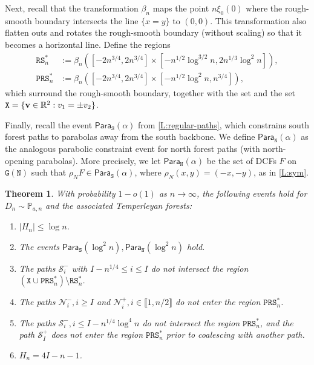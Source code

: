 \documentclass[11pt,twoside]{amsart}
\theoremstyle{plain}
\newtheorem{thm}{Theorem}[section]
\numberwithin{quest}{section}
\theoremstyle{remark}
\numberwithin{rem}{section}
\theoremstyle{definition}
\newcommand{\R}{\mathbb{R}}
\renewcommand{\P}{\mathbb{P}}
\newcommand{\cS}{\mathcal{S}}
\newcommand{\cN}{\mathcal{N}}
\newcommand{\II}[1]{\llbracket #1 \rrbracket}
\renewcommand{\tt}[1]{{\mathtt{#1}}}
\begin{document}
	Next, recall that the transformation $\beta_n$ maps the point $n \xi_0(0)$ where the rough-smooth boundary intersects the line $\{x = y\}$ to $(0,0)$. This transformation also flatten outs and rotates the rough-smooth boundary (without scaling) so that it becomes a horizontal line. Define the regions
	\begin{align*}
		\tt{RS}_n^* &:= \beta_n([-2n^{3/4}, 2n^{3/4}] \times [- n^{1/2} \log^{3/2} n, 2n^{1/3} \log^2 n]), \\
		\tt{PRS}_n^* &:= \beta_n([-2n^{3/4}, 2n^{3/4}] \times [- n^{1/2} \log^{2} n, n^{3/4}]),
	\end{align*}
	which surround the rough-smooth boundary, together with the set
	and the set $\tt{X} = \{{\bf v} \in \R^2 : v_1 = \pm v_2\}$.
	
	Finally, recall the event $\mathsf{Para}_\tt{S}(\alpha)$ from \cref{L:regular-paths}, which constrains south forest paths to parabolas away from the south backbone. We define $\mathsf{Para}_\tt{N}(\alpha)$ as the analogous parabolic constraint event for north forest paths (with north-opening parabolas). More precisely, we let $\mathsf{Para}_\tt{N}(\alpha)$ be the set of DCFs $F$ on $\tt{G(N)}$ such that $\rho_N F \in \mathsf{Para}_\tt{S}(\alpha)$, where $\rho_N(x, y) = (-x, -y)$, as in \cref{L:sym}.
	\begin{thm}
		\label{T:main-3-restatement}
		With probability $1 - o(1)$ as $n \to \infty$, the following events hold for $D_n \sim \P_{a, n}$ and the associated Temperleyan forests:
		\begin{enumerate}[label=\arabic*.]
			\item $|H_n| \le \log n$.
			\item The events $\mathsf{Para}_\tt{S}(\log^2 n), \mathsf{Para}_\tt{N}(\log^2 n)$ hold.
			\item The paths $\cS_i^-$ with $I - n^{1/4} \le i \le I$ do not intersect the region $(\tt{X} \cup \tt{PRS}^*_n)\setminus \tt{RS}^*_n$.
			\item The paths $\cN_i^-, i \ge I$ and $\cN_i^+, i \in \II{1, n/2}$ do not enter the region $\tt{PRS}^*_n$.
			\item The paths $\cS_i^-, i \le I - n^{1/4} \log^4 n$ do not intersect the region $\tt{PRS}^*_n$, and the path $\cS_{I}^+$ does not enter the region $\tt{PRS}^*_n$ prior to coalescing with another path.
			\item $H_n = 4I - n - 1$.
		\end{enumerate}		
	\end{thm}
	
\end{document}
